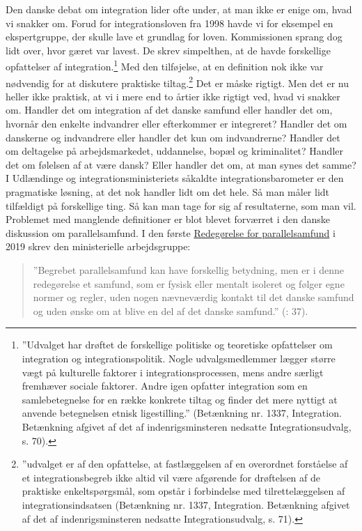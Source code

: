 \documentclass[
]{book}
\begin{document}
Den danske debat om integration lider ofte under, at man ikke er enige om, hvad vi snakker om. Forud for integrationsloven fra 1998 havde vi for eksempel en ekspertgruppe, der skulle lave et grundlag for loven. Kommissionen sprang dog lidt over, hvor gæret var lavest. De skrev simpelthen, at de havde forskellige opfattelser af integration.\footnote{''Udvalget har drøftet de forskellige politiske og teoretiske opfattelser om integration og integrationspolitik. Nogle udvalgsmedlemmer lægger større vægt på kulturelle faktorer i integrationsprocessen, mens andre særligt fremhæver sociale faktorer. Andre igen opfatter integration som en samlebetegnelse for en række konkrete tiltag og finder det mere nyttigt at anvende betegnelsen etnisk ligestilling.'' (Betænkning nr. 1337, Integration. Betænkning afgivet af det af indenrigsminsteren nedsatte Integrationsudvalg, s. 70).} Med den tilføjelse, at en definition nok ikke var nødvendig for at diskutere praktiske tiltag.\footnote{''udvalget er af den opfattelse, at fastlæggelsen af en overordnet forståelse af et integrationsbegreb ikke altid vil være afgørende for drøftelsen af de praktiske enkeltspørgsmål, som opstår i forbindelse med tilrettelæggelsen af integrationsindsatsen (Betænkning nr. 1337, Integration. Betænkning afgivet af det af indenrigsminsteren nedsatte Integrationsudvalg, s. 71).} Det er måske rigtigt. Men det er nu heller ikke praktisk, at vi i mere end to årtier ikke rigtigt ved, hvad vi snakker om. Handler det om integration af det danske samfund eller handler det om, hvornår den enkelte indvandrer eller efterkommer er integreret? Handler det om danskerne og indvandrere eller handler det kun om indvandrerne? Handler det om deltagelse på arbejdsmarkedet, uddannelse, bopæl og kriminalitet? Handler det om følelsen af at være dansk? Eller handler det om, at man synes det samme? I Udlændinge og integrationsministeriets såkaldte integrationsbarometer er den pragmatiske løsning, at det nok handler lidt om det hele. Så man måler lidt tilfældigt på forskellige ting. Så kan man tage for sig af resultaterne, som man vil. Problemet med manglende definitioner er blot blevet forværret i den danske diskussion om parallelsamfund. I den første \href{https://www.sm.dk/Media/638089426274841934/redegoerelse-om-parallelsamfund_web_final-a.pdf}{Redegørelse for parallelsamfund} i 2019 skrev den ministerielle arbejdsgruppe:

\begin{quote}
''Begrebet parallelsamfund kan have forskellig betydning, men er i denne redegørelse et samfund, som er fysisk eller mentalt isoleret og følger egne normer og regler, uden nogen nævneværdig kontakt til det danske samfund og uden ønske om at blive en del af det danske samfund.'' (: 37).
\end{quote}
\end{document}
